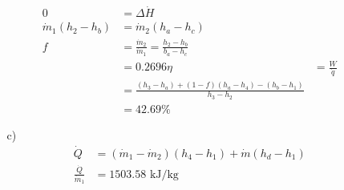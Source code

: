 \documentclass{article}
\begin{document}
\begin{itemize}
\begin{itemize}
\begin{align*}
            0&=\Delta \dot H\\
            \dot{m}_1(h_2-h_b)&=\dot m_2(h_a-h_c)\\
            f&=\frac{\dot m_2}{\dot m_1}=\frac{h_2-h_b}{b_a-h_c}\\
            &=0.2696
            \eta &=\frac{W}{\dot q}\\
            &=\frac{(h_3-h_a)+(1-f)(h_a-h_4)-(h_b-h_1)}{h_3-h_2}\\
            &=42.69\%
        \end{align*}
        \item [c)]
        \begin{align*}
            \dot Q&=(\dot m_1-\dot m_2)(h_4-h_1)+\dot m(h_d-h_1)\\
            \frac{\dot Q}{\dot m_1}&=1503.58 \text{ kJ/kg}
        \end{align*}
    \end{itemize}
\end{itemize}     
\end{document}
